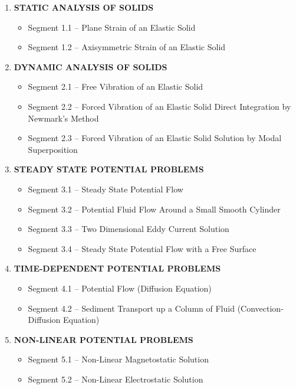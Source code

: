 \begin{enumerate}
\item {\bf STATIC ANALYSIS OF SOLIDS}
\begin{itemize}
\item Segment 1.1  --  Plane Strain of an Elastic Solid
\item Segment 1.2  --  Axisymmetric Strain of an Elastic Solid
\end{itemize}
\item {\bf DYNAMIC ANALYSIS OF SOLIDS}
\begin{itemize}
\item Segment 2.1  --  Free Vibration of an Elastic Solid
\item Segment 2.2  --  Forced Vibration of an Elastic Solid
                Direct Integration by Newmark's Method
\item Segment 2.3  --  Forced Vibration of an Elastic Solid
                Solution by Modal Superposition
\end{itemize}
\item {\bf STEADY STATE POTENTIAL PROBLEMS}
\begin{itemize}
\item Segment 3.1  --  Steady State Potential Flow
\item Segment 3.2  --  Potential Fluid Flow Around a Small
                Smooth Cylinder
\item Segment 3.3  --  Two Dimensional Eddy Current Solution
\item Segment 3.4  --  Steady State Potential Flow with a
               Free Surface
\end{itemize}
\item {\bf TIME-DEPENDENT POTENTIAL PROBLEMS}
\begin{itemize}
\item Segment 4.1  --  Potential Flow (Diffusion Equation)
\item Segment 4.2  --  Sediment Transport up a Column of Fluid
               (Convection-Diffusion Equation)
\end{itemize}
\item {\bf NON-LINEAR POTENTIAL PROBLEMS}
\begin{itemize}
\item Segment 5.1  --  Non-Linear Magnetostatic Solution
\item Segment 5.2  --  Non-Linear Electrostatic Solution
\end{itemize}
\end{enumerate}
